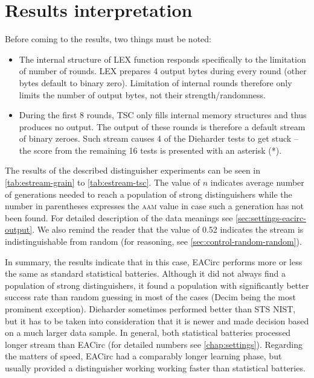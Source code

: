 \documentclass[12pt,twoside]{fithesis2}		%
\renewcommand{\_}{\leavevmode \kern0.0em\vbox{\hrule width0.4em}}
\newcommand{\squarebullet}{\textcolor{black}{\raisebox{0.15em}{\rule{4pt}{4pt}}}}
\newenvironment{myItemize}{
  \begin{itemize}[leftmargin=2em,rightmargin=1em,itemsep=\parskip ,parsep=0em,topsep=0em,partopsep=0em]
  \renewcommand{\labelitemi}{\squarebullet}
  \renewcommand{\labelitemii}{$\diamond$}
}{
  \end{itemize}
}
\begin{document}
\section{Results interpretation}
\label{sec:estream-results}

Before coming to the results, two things must be noted:
\begin{myItemize}
\item The internal structure of LEX function responds specifically to the limitation of number of rounds.
LEX prepares 4 output bytes during every round (other bytes default to binary zero). 
Limitation of internal rounds therefore only limits the number
of output bytes, not their strength/randomness.
\item During the first 8 rounds, TSC only fills internal memory structures and thus produces no output. The output of these rounds
is therefore a default stream of binary zeroes. Such stream causes 4 of the Dieharder tests to get stuck --
the score from the remaining 16 tests is presented with an asterisk (*).
\end{myItemize}

\noindent
The results of the described distinguisher experiments can be seen in \autoref{tab:estream-grain} to
\autoref{tab:estream-tsc}. The value of $n$ indicates average number of generations needed to reach a population of
strong distinguishers while the number in parentheses expresses the \textsc{aam} value in case such a generation has not been
found. For detailed description of the data meanings see \autoref{sec:settings-eacirc-output}. We also remind the reader
that the value of 0.52 indicates the stream is indistinguishable from random (for reasoning, see \autoref{sec:control-random-random}).

In summary, the results indicate that in this case, EACirc performs more or less the same as standard statistical batteries.
Although it did not always find a population of strong distinguishers, it found a population with significantly better
success rate than random guessing in most of the cases (Decim being the most prominent exception).
Dieharder sometimes performed better than STS NIST, but it has to be taken into consideration that it is newer
and made decision based on a much larger data sample. In general, both statistical batteries processed longer stream than EACirc
(for detailed numbers see \autoref{chap:settings}). Regarding the matters of speed, EACirc had a comparably longer learning phase,
but usually provided a distinguisher working working faster than statistical batteries.
\medskip
\end{document}
